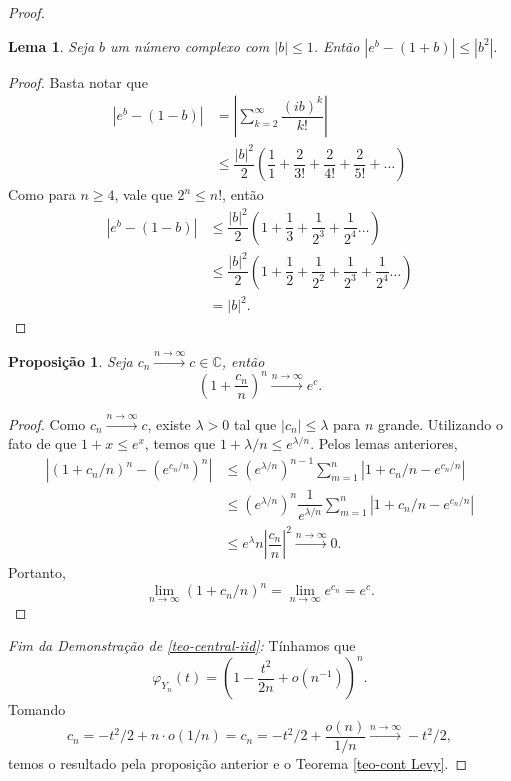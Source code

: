 \documentclass[12pt,a4paper,oneside]{book}
\newtheorem{proposition}[theorem]{Proposi\c{c}\~ao}
\newtheorem{lemma}[theorem]{Lema}
\theoremstyle{definition}
\theoremstyle{remark}
\numberwithin{equation}{section}
\newcommand{\rarrowlimn}{\xrightarrow{n\rightarrow \infty}}
\begin{document}
\begin{proof}
\begin{lemma}
Seja $b$ um número complexo com $|b|\leq 1$. Então $|e^b-(1+b)|\leq |b^2|.$
\end{lemma}
\begin{proof}
Basta notar que
\begin{align*}
|e^b - (1-b)| &= \left|\sum_{k=2}^\infty  \dfrac{(ib)^k}{k!} \right| \\
&\leq \dfrac{|b|^2}{2} \left(  \dfrac{1 }{1}+ \dfrac{2 }{3!}+ \dfrac{2 }{4!}+\dfrac{2 }{5!}+\dots \right)
\end{align*}
Como para $n\geq 4$, vale que $2^n\leq n!$,  então
\begin{align*}
|e^b - (1-b)| &\leq \dfrac{|b|^2}{2} \left(  1+ \dfrac{1 }{3}+ \dfrac{1 }{2^3}+\dfrac{1 }{2^4}\dots \right)\\
&\leq \dfrac{|b|^2}{2}\left(  1+ \dfrac{1 }{2}+ \dfrac{1 }{2^2}+ \dfrac{1 }{2^3}+\dfrac{1 }{2^4}\dots \right) \\
&= |b|^2.
\end{align*}
\end{proof}

\begin{proposition}
Seja $c_n\rarrowlimn c\in \mathbb{C}$, então 
$$\left( 1+\dfrac{c_n}{n}  \right)^n \rarrowlimn e^c. $$
\end{proposition}
\begin{proof}
Como $c_n \rarrowlimn c$, existe $\lambda>0$ tal que $|c_n|\leq \lambda$ para $n$ grande. Utilizando o fato de que $1+x\leq e^x$, temos que $1+\lambda/n\leq e^{\lambda/n}$. Pelos lemas anteriores,
\begin{align*}
|(1+c_n/n)^n - (e^{c_n/n})^n|&\leq (e^{\lambda/n})^{n-1} \sum_{m=1}^n |1+c_n/n - e^{c_n/n}|\\
&\leq (e^{\lambda/n})^{n} \dfrac{1}{e^{\lambda/n}}\sum_{m=1}^n |1+c_n/n - e^{c_n/n}|\\
&\leq e^{\lambda}n\left|\dfrac{c_n}{n}\right|^2 \rarrowlimn 0.
\end{align*}
Portanto,
$$\lim_{n\rightarrow \infty}(1+c_n/n)^n = \lim_{n\rightarrow \infty} e^{c_n} = e^c. $$
\end{proof}


\noindent\emph{Fim da Demonstração de \ref{teo-central-iid}:} Tínhamos que
$$\varphi_{Y_n}(t) = \left(1 - \dfrac{t^2}{2n} + o(n^{-1})   \right)^n.  $$
Tomando 
$$c_n = -t^2/2 + n\cdot o(1/n) = c_n = -t^2/2 + \dfrac{o(n)}{1/n} \rarrowlimn -t^2/2,$$
temos o resultado pela proposição anterior e o Teorema \ref{teo-cont Levy}.















\end{proof}
\end{document}
